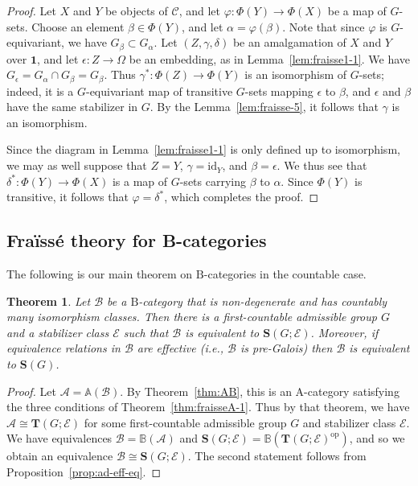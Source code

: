 \documentclass[12pt]{amsart}
\numberwithin{equation}{section}
\newtheorem{theorem}[equation]{Theorem}
\theoremstyle{definition}
\newcommand{\cA}{\mathcal{A}}
\newcommand{\cB}{\mathcal{B}}
\newcommand{\rB}{\mathrm{B}}
\newcommand{\cC}{\mathcal{C}}
\newcommand{\sE}{\mathscr{E}}
\newcommand{\bS}{\mathbf{S}}
\newcommand{\bT}{\mathbf{T}}
\renewcommand{\AA}{\mathbb{A}}
\newcommand{\BB}{\mathbb{B}}
\renewcommand{\phi}{\varphi}
\newcommand{\id}{\mathrm{id}}
\newcommand{\op}{\mathrm{op}}
\newcommand{\bone}{\mathbf{1}}
\begin{document}
\begin{proof}
Let $X$ and $Y$ be objects of $\cC$, and let $\phi \colon \Phi(Y) \to \Phi(X)$ be a map of $G$-sets. Choose an element $\beta \in \Phi(Y)$, and let $\alpha=\phi(\beta)$. Note that since $\phi$ is $G$-equivariant, we have $G_{\beta} \subset G_{\alpha}$. Let $(Z,\gamma,\delta)$ be an amalgamation of $X$ and $Y$ over $\bone$, and let $\epsilon \colon Z \to \Omega$ be an embedding, as in Lemma~\ref{lem:fraisse1-1}. We have $G_{\epsilon}=G_{\alpha} \cap G_{\beta}=G_{\beta}$. Thus $\gamma^* \colon \Phi(Z) \to \Phi(Y)$ is an isomorphism of $G$-sets; indeed, it is a $G$-equivariant map of transitive $G$-sets mapping $\epsilon$ to $\beta$, and $\epsilon$ and $\beta$ have the same stabilizer in $G$. By the Lemma~\ref{lem:fraisse-5}, it follows that $\gamma$ is an isomorphism.

Since the diagram in Lemma~\ref{lem:fraisse1-1} is only defined up to isomorphism, we may as well suppose that $Z=Y$, $\gamma=\id_Y$, and $\beta=\epsilon$. We thus see that $\delta^* \colon \Phi(Y) \to \Phi(X)$ is a map of $G$-sets carrying $\beta$ to $\alpha$. Since $\Phi(Y)$ is transitive, it follows that $\phi=\delta^*$, which completes the proof.
\end{proof}

\subsection{Fra\"iss\'e theory for B-categories}

The following is our main theorem on $\rB$-categories in the countable case.

\begin{theorem} \label{thm:fraisseB}
Let $\cB$ be a $\rB$-category that is non-degenerate and has countably many isomorphism classes. Then there is a first-countable admissible group $G$ and a stabilizer class $\sE$ such that $\cB$ is equivalent to $\bS(G;\sE)$. Moreover, if equivalence relations in $\cB$ are effective (i.e., $\cB$ is pre-Galois) then $\cB$ is equivalent to $\bS(G)$.
\end{theorem}

\begin{proof}
Let $\cA=\AA(\cB)$. By Theorem~\ref{thm:AB}, this is an A-category satisfying the three conditions of Theorem~\ref{thm:fraisseA-1}. Thus by that theorem, we have $\cA \cong \bT(G; \sE)$ for some first-countable admissible group $G$ and stabilizer class $\sE$. We have equivalences $\cB=\BB(\cA)$ and $\bS(G;\sE)=\BB(\bT(G;\sE)^{\op})$, and so we obtain an equivalence $\cB \cong \bS(G;\sE)$. The second statement follows from Proposition~\ref{prop:ad-eff-eq}.
\end{proof}
\end{document}
